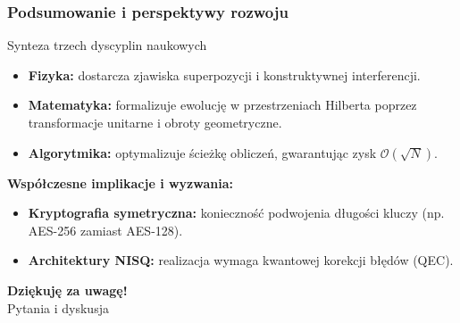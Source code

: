 \documentclass[aspectratio=169]{beamer}
\begin{document}
\begin{frame}
    \frametitle{Podsumowanie i perspektywy rozwoju}

    \begin{block}{Synteza trzech dyscyplin naukowych}
        \begin{itemize}
            \item \textbf{Fizyka:} dostarcza zjawiska superpozycji i konstruktywnej interferencji.
            \item \textbf{Matematyka:} formalizuje ewolucję w przestrzeniach Hilberta poprzez transformacje unitarne i obroty geometryczne.
            \item \textbf{Algorytmika:} optymalizuje ścieżkę obliczeń, gwarantując zysk $\mathcal{O}(\sqrt{N})$.
        \end{itemize}
    \end{block}

    \vspace{0.1cm}
    \textbf{Współczesne implikacje i wyzwania:}
    \begin{itemize}
        \item \textbf{Kryptografia symetryczna:} konieczność podwojenia długości kluczy (np. AES-256 zamiast AES-128).
        \item \textbf{Architektury NISQ:} realizacja wymaga kwantowej korekcji błędów (QEC).
    \end{itemize}

    \vspace{0.1cm}
    \begin{center}
        \textbf{\large Dziękuję za uwagę!} \\
        {\footnotesize Pytania i dyskusja}
    \end{center}
\end{frame}
\end{document}
